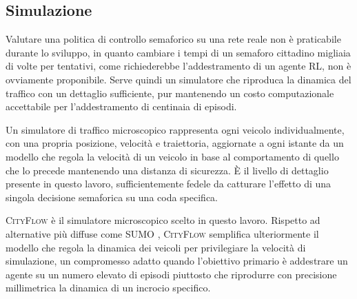 \subsection{Simulazione}

Valutare una politica di controllo semaforico su una rete reale non è
praticabile durante lo sviluppo, in quanto cambiare i tempi di un semaforo cittadino
migliaia di volte per tentativi, come richiederebbe l'addestramento di un
agente RL, non è ovviamente proponibile. Serve quindi un simulatore che
riproduca la dinamica del traffico con un dettaglio sufficiente, pur
mantenendo un costo computazionale accettabile per l'addestramento di
centinaia di episodi.

Un simulatore di traffico microscopico rappresenta ogni veicolo
individualmente, con una propria posizione, velocità e traiettoria,
aggiornate a ogni istante da un modello che regola la velocità di un
veicolo in base al comportamento di quello che lo precede mantenendo una distanza di sicurezza.
È il livello di dettaglio presente in questo lavoro, sufficientemente fedele da catturare l'effetto di una singola
decisione semaforica su una coda specifica.

\textsc{CityFlow} \citep{zhang2019cityflow} è il simulatore microscopico scelto in questo lavoro. Rispetto ad alternative più diffuse
come SUMO \citep{lopez2018sumo}, \textsc{CityFlow} semplifica ulteriormente il modello che regola la dinamica dei veicoli per privilegiare la velocità di simulazione,
un compromesso adatto quando l'obiettivo primario è addestrare un agente su un numero elevato di episodi piuttosto
che riprodurre con precisione millimetrica la dinamica di un incrocio specifico.
